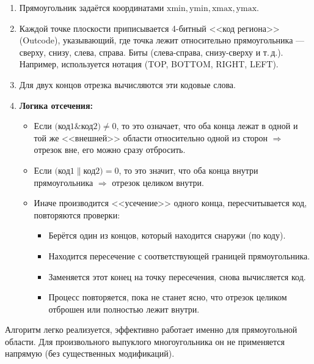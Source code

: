 \documentclass[areasetadvanced]{scrartcl}
\begin{document}
\begin{enumerate}
    \item Прямоугольник задаётся координатами 
    \(\text{xmin}, \text{ymin}, \text{xmax}, \text{ymax}\).
    \item Каждой точке плоскости приписывается 4-битный <<код региона>> 
    (Outcode), указывающий, где точка лежит относительно прямоугольника — 
    сверху, снизу, слева, справа. Биты (слева-справа, снизу-сверху и 
    т.\,д.). Например, используется нотация (TOP, BOTTOM, RIGHT, LEFT).
    \item Для двух концов отрезка вычисляются эти кодовые слова.
    \item \textbf{Логика отсечения:}
    \begin{itemize}
        \item Если \(\bigl(\text{код1} \mathbin{\&} \text{код2}\bigr) \neq 0\), 
        то это означает, что оба конца лежат в одной и той же 
        <<внешней>> области относительно одной из сторон 
        \(\Rightarrow\) отрезок вне, его можно сразу отбросить.
        \item Если \(\bigl(\text{код1} \mathbin{\|} \text{код2}\bigr) = 0\), 
        то это значит, что оба конца внутри прямоугольника 
        \(\Rightarrow\) отрезок целиком внутри.
        \item Иначе производится <<усечение>> одного конца, пересчитывается код, 
        повторяются проверки:
        \begin{itemize}
            \item Берётся один из концов, который находится 
            снаружи (по коду).
            \item Находится пересечение с соответствующей границей 
            прямоугольника.
            \item Заменяется этот конец на точку пересечения, 
            снова вычисляется код.
            \item Процесс повторяется, пока не станет ясно, 
            что отрезок целиком отброшен или полностью лежит внутри.
        \end{itemize}
    \end{itemize}
\end{enumerate}

Алгоритм легко реализуется, эффективно работает именно для прямоугольной 
области. Для произвольного выпуклого многоугольника он не применяется 
напрямую (без существенных модификаций).
\end{document}

